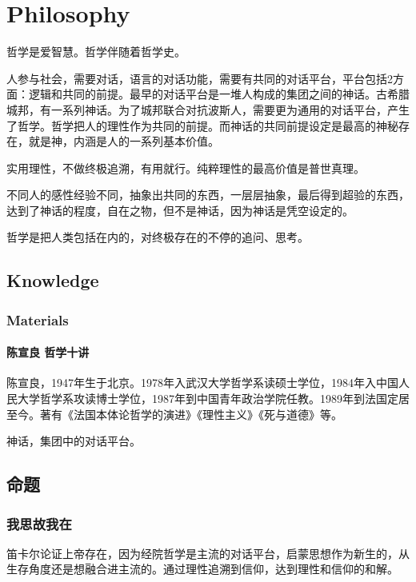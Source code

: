 

\chapter{Philosophy}
哲学是爱智慧。哲学伴随着哲学史。

人参与社会，需要对话，语言的对话功能，需要有共同的对话平台，平台包括2方面：逻辑和共同的前提。最早的对话平台是一堆人构成的集团之间的神话。古希腊城邦，有一系列神话。为了城邦联合对抗波斯人，需要更为通用的对话平台，产生了哲学。哲学把人的理性作为共同的前提。而神话的共同前提设定是最高的神秘存在，就是神，内涵是人的一系列基本价值。

实用理性，不做终极追溯，有用就行。纯粹理性的最高价值是普世真理。

不同人的感性经验不同，抽象出共同的东西，一层层抽象，最后得到超验的东西，达到了神话的程度，自在之物，但不是神话，因为神话是凭空设定的。

哲学是把人类包括在内的，对终极存在的不停的追问、思考。

\section{Knowledge}

\subsection{Materials}

\subsubsection{ 陈宣良 哲学十讲}
陈宣良，1947年生于北京。1978年入武汉大学哲学系读硕士学位，1984年入中国人民大学哲学系攻读博士学位，1987年到中国青年政治学院任教。1989年到法国定居至今。著有《法国本体论哲学的演进》《理性主义》《死与道德》等。



神话，集团中的对话平台。

\section{命题}

\subsection{我思故我在}

笛卡尔论证上帝存在，因为经院哲学是主流的对话平台，启蒙思想作为新生的，从生存角度还是想融合进主流的。通过理性追溯到信仰，达到理性和信仰的和解。

